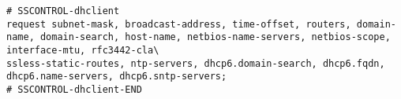 \begin{lstlisting}[style=rcfile_nonumbers,
label=lst:dhclient_maincf_example,
title={Example of the DHCP configuration file that is created from the Dhclient profile.
The file is saved as /etc/dhcp3/dhclient.conf}]
# SSCONTROL-dhclient                                                                                                                                                 
request subnet-mask, broadcast-address, time-offset, routers, domain-name, domain-search, host-name, netbios-name-servers, netbios-scope, interface-mtu, rfc3442-cla\
ssless-static-routes, ntp-servers, dhcp6.domain-search, dhcp6.fqdn, dhcp6.name-servers, dhcp6.sntp-servers;
# SSCONTROL-dhclient-END                                                                                                                                             

\end{lstlisting}

